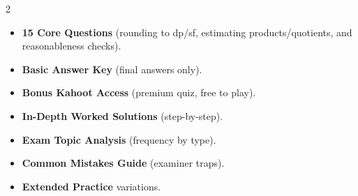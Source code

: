 \documentclass[11pt,a4paper]{article}
\newcommand{\FullReleaseDate}{April 30, 2026}
\begin{document}
\vspace{8pt}

\begin{multicols}{2}
  \begin{tcolorbox}[card, title=\sffamily\bfseries\textcolor{white}{\faHandPointDown\ TODAY (Simplified Version)}, colbacktitle=mainblue, boxed title style={sharp corners, boxrule=0pt}]
    \begin{itemize}[leftmargin=1.2em, itemsep=2pt]
      \item \small \textbf{15 Core Questions} (rounding to dp/sf, estimating products/quotients, and reasonableness checks).
      \item \small \textbf{Basic Answer Key} (final answers only).
      \item \small \textbf{Bonus Kahoot Access} (premium quiz, free to play).
    \end{itemize}
  \end{tcolorbox}

  \columnbreak

  \begin{tcolorbox}[card, title=\sffamily\bfseries\textcolor{white}{\faRocket\ ON \FullReleaseDate\ (Full Upgrade)}, colbacktitle=mainblue, boxed title style={sharp corners, boxrule=0pt}]
    \begin{itemize}[leftmargin=1.2em, itemsep=2pt]
      \item \small \textbf{In-Depth Worked Solutions} (step-by-step).
      \item \small \textbf{Exam Topic Analysis} (frequency by type).
      \item \small \textbf{Common Mistakes Guide} (examiner traps).
      \item \small \textbf{Extended Practice} variations.
    \end{itemize}
  \end{tcolorbox}
\end{multicols}
\end{document}

